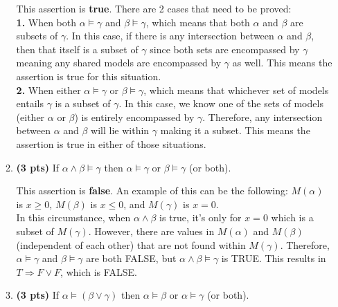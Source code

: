 \documentclass{article}
\begin{document}
\begin{enumerate}
\begin{enumerate}[label=($\alph*$)]
    \color{blue}
        This assertion is \textbf{true}. There are 2 cases that need to be proved:\\
        \textbf{1.} When both $\alpha \models \gamma$ and $\beta \models \gamma$, which means that both $\alpha$ and $\beta$ are subsets of $\gamma$. In this case, if there is any intersection between $\alpha$ and $\beta$, then that itself is a subset of $\gamma$ since both sets are encompassed by $\gamma$ meaning any shared models are encompassed by $\gamma$ as well. This means the assertion is true for this situation.\\
        \textbf{2.} When either $\alpha \models \gamma$ or $\beta \models \gamma$, which means that whichever set of models entails $\gamma$ is a subset of $\gamma$. In this case, we know one of the sets of models (either $\alpha$ or $\beta$) is entirely encompassed by $\gamma$. Therefore, any intersection between $\alpha$ and $\beta$ will lie within $\gamma$ making it a subset. This means the assertion is true in either of those situations.
    \color{black}



    \item \textbf{(3 pts)} If $\alpha \wedge \beta \models \gamma$ then $\alpha \models \gamma$ or $\beta \models \gamma$ (or both).

    \color{blue}
        This assertion is \textbf{false}. An example of this can be the following: $M(\alpha)$ is $x \geq 0$, $M(\beta)$ is $x \leq 0$, and $M(\gamma)$ is $x = 0$.\\
        In this circumstance, when $\alpha \wedge \beta$ is true, it's only for $x = 0$ which is a subset of $M(\gamma)$. However, there are values in $M(\alpha)$ and $M(\beta)$ (independent of each other) that are not found within $M(\gamma)$. Therefore, $\alpha \models \gamma$ and $\beta \models \gamma$ are both FALSE, but $\alpha \wedge \beta \models \gamma$ is TRUE. This results in $T \Rightarrow F \vee F$, which is FALSE.
    \color{black}



    \item \textbf{(3 pts)} If $\alpha \models (\beta \vee \gamma)$ then $\alpha \models \beta$ or $\alpha \models \gamma$ (or both).


\end{enumerate}
\end{enumerate}
\end{document}
